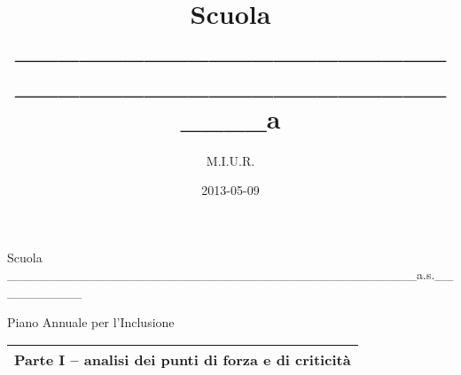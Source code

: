 \documentclass[a4paper]{article}
\title{Scuola \_\_\_\_\_\_\_\_\_\_\_\_\_\_\_\_\_\_\_\_\_\_\_\_\_\_\_\_\_\_\_\_\_\_\_\_\_\_\_\_\_\_\_\_a}
\author{M.I.U.R.}
\date{2013-05-09}
\begin{document}
\clearpage\setcounter{page}{1}\pagestyle{Standard}
{\sffamily
Scuola \_\_\_\_\_\_\_\_\_\_\_\_\_\_\_\_\_\_\_\_\_\_\_\_\_\_\_\_\_\_\_\_\_\_\_\_\_\_\_\_\_\_\_\_a.s.\_\_\_\_\_\_\_\_\_\_}


\bigskip

{\centering{}\sffamily
Piano Annuale per l'Inclusione
\par}


\bigskip

\begin{flushleft}
\tablefirsthead{}
\tablehead{}
\tabletail{}
\tablelasttail{}
\begin{supertabular}{|m{17.064999cm}|}
\hline
{\sffamily\bfseries Parte I -- analisi dei punti di forza e di criticit\`a}\\\hline
\end{supertabular}
\end{flushleft}

\bigskip
\end{document}
